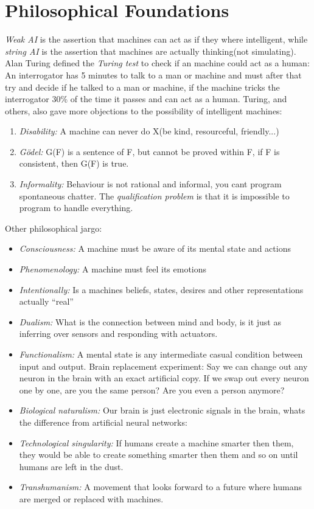 \documentclass[11pt, letterpaper]{report}
\numberwithin{equation}{section}
\begin{document}
\section{Philosophical Foundations}
\emph{Weak AI} is the assertion that machines can act as if they where
intelligent, while \emph{string AI} is the assertion that machines are actually
thinking(not simulating). Alan Turing defined the \emph{Turing test} to check if
an machine could act as a human: An interrogator has 5 minutes to talk to a man
or machine and must after that try and decide if he talked to a man or machine,
if the machine tricks the interrogator 30\% of the time it passes and can act as
a human. Turing, and others, also gave more objections to the possibility of intelligent
machines:
\begin{enumerate}
\item \emph{Disability:} A machine can never do X(be kind, resourceful, friendly...)
\item \emph{Gödel:} G(F) is a sentence of F, but cannot be proved within F, if F
  is consistent, then G(F) is true.
\item \emph{Informality:} Behaviour is not rational and informal, you cant
  program spontaneous chatter. The \emph{qualification problem} is that it is
  impossible to program to handle everything.
\end{enumerate}

Other philosophical jargo:
\begin{itemize}
\item \emph{Consciousness:} A machine must be aware of its mental state and actions
\item \emph{Phenomenology:} A machine must feel its emotions
\item \emph{Intentionally:} Is a machines beliefs, states, desires and other
  representations actually ``real''
\item \emph{Dualism:} What is the connection between mind and body, is it just
  as inferring over sensors and responding with actuators.
\item \emph{Functionalism:} A mental state is any intermediate casual condition
  between input and output. Brain replacement experiment: Say we can change out
  any neuron in the brain with an exact artificial copy. If we swap out every
  neuron one by one, are you the same person? Are you even a person anymore?
\item \emph{Biological naturalism:} Our brain is just electronic signals in the
  brain, whats the difference from artificial neural networks:
\item \emph{Technological singularity:} If humans create a machine smarter then
  them, they would be able to create something smarter then them and so on
  until humans are left in the dust.
\item \emph{Transhumanism:} A movement that looks forward to a future where
  humans are merged or replaced with machines.
\end{itemize}
\end{document}
